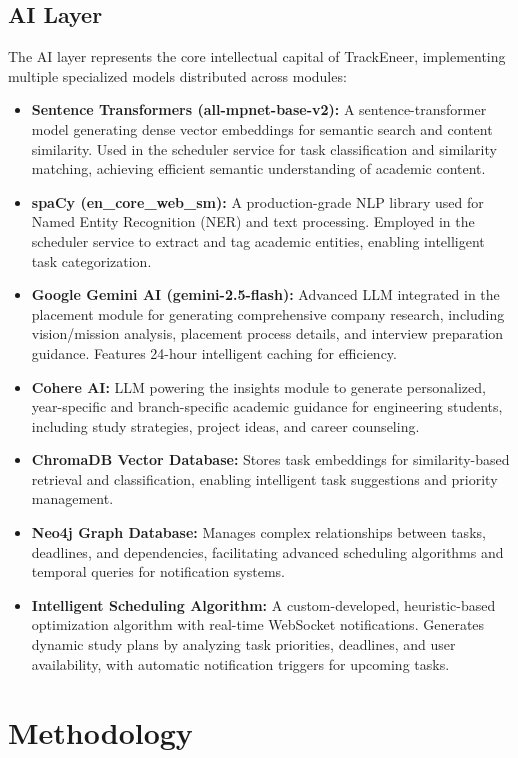 \documentclass[conference]{IEEEtran}
\begin{document}
\subsection{AI Layer}
The AI layer represents the core intellectual capital of TrackEneer, implementing multiple specialized models distributed across modules:
\begin{itemize}
    \item \textbf{Sentence Transformers (all-mpnet-base-v2):} A sentence-transformer model generating dense vector embeddings for semantic search and content similarity. Used in the scheduler service for task classification and similarity matching, achieving efficient semantic understanding of academic content.
    \item \textbf{spaCy (en\_core\_web\_sm):} A production-grade NLP library used for Named Entity Recognition (NER) and text processing. Employed in the scheduler service to extract and tag academic entities, enabling intelligent task categorization.
    \item \textbf{Google Gemini AI (gemini-2.5-flash):} Advanced LLM integrated in the placement module for generating comprehensive company research, including vision/mission analysis, placement process details, and interview preparation guidance. Features 24-hour intelligent caching for efficiency.
    \item \textbf{Cohere AI:} LLM powering the insights module to generate personalized, year-specific and branch-specific academic guidance for engineering students, including study strategies, project ideas, and career counseling.
    \item \textbf{ChromaDB Vector Database:} Stores task embeddings for similarity-based retrieval and classification, enabling intelligent task suggestions and priority management.
    \item \textbf{Neo4j Graph Database:} Manages complex relationships between tasks, deadlines, and dependencies, facilitating advanced scheduling algorithms and temporal queries for notification systems.
    \item \textbf{Intelligent Scheduling Algorithm:} A custom-developed, heuristic-based optimization algorithm with real-time WebSocket notifications. Generates dynamic study plans by analyzing task priorities, deadlines, and user availability, with automatic notification triggers for upcoming tasks.
\end{itemize}

\section{Methodology}
\end{document}
